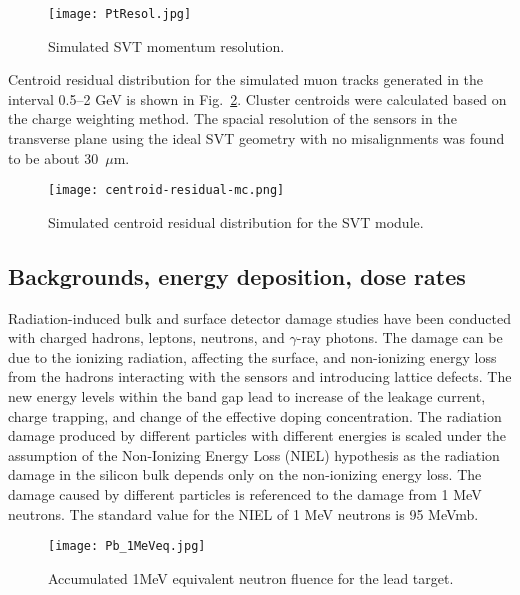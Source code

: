 \begin{figure}[hbt]
\texttt{[image: PtResol.jpg]}
\caption{Simulated SVT momentum resolution.}
\label{fig:PtRes}
\end{figure}

Centroid residual distribution for the simulated muon tracks generated in the interval 0.5--2 GeV is shown in Fig.~\ref{fig:centroid-residual-mc}. Cluster centroids were calculated based on the charge weighting method. The spacial resolution of the sensors in the transverse plane using the ideal SVT geometry with no misalignments was found to be about 30~$\mu$m. 

\begin{figure}[hbt]
\texttt{[image: centroid-residual-mc.png]}
\caption{Simulated centroid residual distribution for the SVT module.}
\label{fig:centroid-residual-mc}
\end{figure}

\subsection{Backgrounds, energy deposition, dose rates}

Radiation-induced bulk and surface detector damage studies have been conducted with charged hadrons, leptons, neutrons, and $\gamma$-ray photons. The damage can be due to the ionizing radiation, affecting the surface, and non-ionizing energy loss from the hadrons interacting with the sensors and introducing lattice defects. The new energy levels within the band gap lead to increase of the leakage current, charge trapping, and change of the effective doping concentration. The radiation damage produced by different particles with different energies is scaled under the assumption of the Non-Ionizing Energy Loss (NIEL) hypothesis as the radiation damage in the silicon bulk depends only on the non-ionizing energy loss. The damage caused by different particles is referenced to the damage from 1 MeV neutrons. The standard value for the NIEL of 1 MeV neutrons is 95 MeVmb. 

\begin{figure}[hbt] 
\centering 
\texttt{[image: Pb\_1MeVeq.jpg]}
\caption{Accumulated 1MeV equivalent neutron fluence for the lead target.}
\label{fig:fluka1}
\end{figure}

